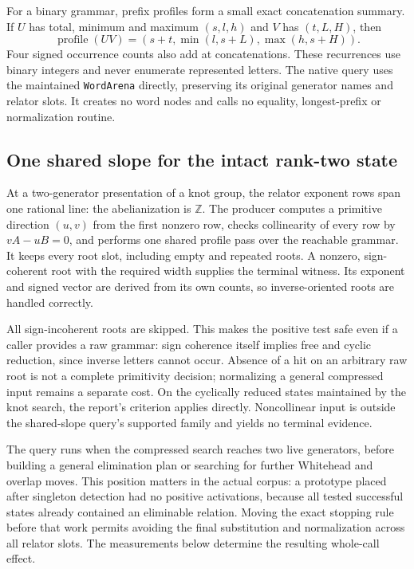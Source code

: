 For a binary grammar, prefix profiles form a small exact concatenation
summary. If $U$ has total, minimum and maximum $(s,l,h)$ and $V$ has
$(t,L,H)$, then
\[
 \operatorname{profile}(UV)
   =(s+t,\min(l,s+L),\max(h,s+H)).
\]
Four signed occurrence counts also add at concatenations. These recurrences
use binary integers and never enumerate represented letters. The native
query uses the maintained \texttt{WordArena} directly, preserving its
original generator names and relator slots. It creates no word nodes and
calls no equality, longest-prefix or normalization routine.

\subsection{One shared slope for the intact rank-two state}

At a two-generator presentation of a knot group, the relator exponent rows
span one rational line: the abelianization is $\mathbb Z$. The producer
computes a primitive direction $(u,v)$ from the first nonzero row, checks
collinearity of every row by $vA-uB=0$, and performs one shared profile
pass over the reachable grammar. It keeps every root slot, including empty
and repeated roots. A nonzero, sign-coherent root with the required width
supplies the terminal witness. Its exponent and signed vector are derived
from its own counts, so inverse-oriented roots are handled correctly.

All sign-incoherent roots are skipped. This makes the positive test safe
even if a caller provides a raw grammar: sign coherence itself implies
free and cyclic reduction, since inverse letters cannot occur. Absence
of a hit on an arbitrary raw root is not a complete primitivity decision;
normalizing a general compressed input remains a separate cost. On the
cyclically reduced states maintained by the knot search, the report's
criterion applies directly. Noncollinear input is outside the shared-slope
query's supported family and yields no terminal evidence.

The query runs when the compressed search reaches two live generators,
before building a general elimination plan or searching for further
Whitehead and overlap moves. This position matters in the actual corpus:
a prototype placed after singleton detection had no positive activations,
because all tested successful states already contained an eliminable
relation. Moving the exact stopping rule before that work permits avoiding
the final substitution and normalization across all relator slots. The
measurements below determine the resulting whole-call effect.

